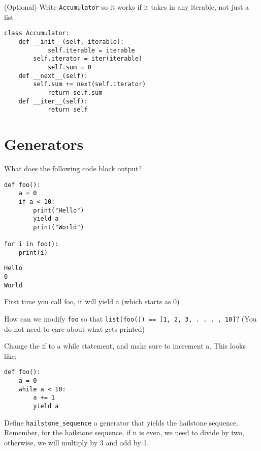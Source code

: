 \documentclass{exam}
\begin{document}
\begin{questions}
\begin{blocksection}
\question (Optional) Write \texttt{Accumulator} so it works if it takes in any iterable, not just a list

\begin{solution}[1.5in]
\begin{lstlisting}
class Accumulator:
	def __init__(self, iterable):
    		self.iterable = iterable
		self.iterator = iter(iterable)
            self.sum = 0
	def __next__(self):
    	self.sum += next(self.iterator)
    		return self.sum
	def __iter__(self):
    		return self
\end{lstlisting}
\end{solution}
\end{blocksection}


\section{Generators}

\begin{blocksection}
\question What does the following code block output?
\begin{lstlisting}
def foo():
	a = 0
	if a < 10:
		print("Hello")
		yield a
		print("World")

for i in foo():
	print(i)
\end{lstlisting}

\begin{solution}[0.75in]
\begin{lstlisting}
Hello
0
World
\end{lstlisting}
First time you call foo, it will yield a (which starts as 0)
\end{solution}

\question How can we modify \texttt{foo} so that \texttt{list(foo()) == [1, 2, 3, . . . , 10]}?  (You do not need to care about what gets printed)

\begin{solution}[0.75in]
Change the if to a while statement, and make sure to increment a. This looks like: 

\begin{lstlisting}
def foo():
	a = 0
	while a < 10:
		a += 1
		yield a
\end{lstlisting}
\end{solution}
\end{blocksection}


\begin{blocksection}
\question Define \texttt{hailstone\_sequence} a generator that yields the hailstone sequence. Remember, for the hailstone sequence, if n is even, we need to divide by two, otherwise, we will multiply by 3 and add by 1. 


\end{blocksection}
\end{questions}
\end{document}
